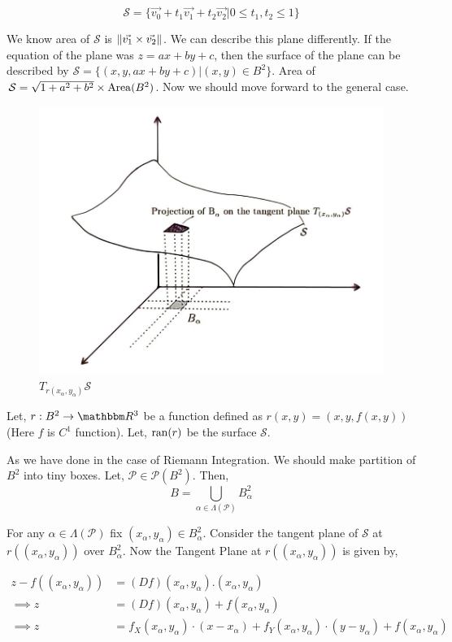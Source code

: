 \documentclass[../Analysis-3]{subfiles}
\begin{document}
$$ \mathcal{S} = \{ \vec{v_0} + t_1 \vec{v_1} +t_2 \vec{v_2}  |  0 \le t_1,t_2 \le 1\} $$

We know area of $\mathcal{S}$ is $\norm{\vec{v_1}\times \vec{v_2}}$. We can describe this plane differently. If the equation of the plane was $z=ax+by+c$, then the surface of the plane can be described by $\mathcal{S} = \{(x, y, ax+by+c) | (x,y) \in B^2 \}$. Area of $\mathcal{S} = \sqrt{1+a^2+b^2} \times \operatorname{Area}(B^2)$. Now we should move forward to the general case.

\begin{figure}
    \centering
    \includegraphics[width=.78\linewidth]{../figures/lec-25.2.png}
    \caption{$T_{r(x_{\alpha},y_{\alpha})} \mathcal{S}$}
\end{figure}


Let, $r : B^2 \to \R^3$ be a function defined as $r(x,y) = (x,y,f(x,y))$ (Here $f$ is $C^1$ function). Let, $\operatorname{ran}(r)$ be the surface $\mathcal{S}$.

\vspace{0.2cm}

As we have done in the case of Riemann Integration. We should make partition of $B^2$ into tiny boxes.  Let, $\mathcal{P} \in \mathscr{P}(B^2)$. Then,
\[B = \bigcup_{\alpha \in \Lambda(\mathcal{P})} B_{\alpha}^2\]

For any $\alpha \in \Lambda(\mathcal{P})$ fix $(x_{\alpha},y_{\alpha}) \in B_{\alpha}^2$. Consider the tangent plane of $\mathcal{S}$ at $r((x_{\alpha},y_{\alpha}))$ over $B_{\alpha}^2$. Now the Tangent Plane at $r((x_{\alpha},y_{\alpha}))$ is given by,

\begin{align*}
    z - f((x_{\alpha},y_{\alpha})) & = (Df)(x_{\alpha},y_{\alpha}).(x_{\alpha},y_{\alpha})                                                                             \\
    \implies z                     & = (Df)(x_{\alpha},y_{\alpha}) + f(x_{\alpha},y_{\alpha})                                                                          \\
    \implies z                     & = f_X(x_{\alpha},y_{\alpha}) \cdot (x - x_{\alpha}) +f_Y(x_{\alpha},y_{\alpha}) \cdot (y - y_{\alpha}) + f(x_{\alpha},y_{\alpha}) \\
\end{align*}
\end{document}
